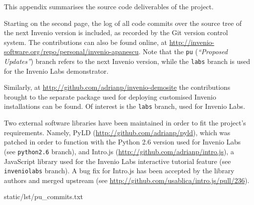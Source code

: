 
This appendix summarises the source code deliverables of the project.

Starting on the second page, the log of all code commits over the source tree
of the next Invenio version is included, as recorded by the Git version control
system. The contributions can also be found online, at
\url{http://invenio-software.org/repo/personal/invenio-apanescu}. Note that the
\texttt{pu} (\textit{``Proposed Updates''}) branch refers to the next Invenio
version, while the \texttt{labs} branch is used for the Invenio Labs
demonstrator.

Similarly, at \url{http://github.com/adrianp/invenio-demosite} the contributions
brought to the separate package used for deploying customised Invenio
installations can be found. Of interest is the \texttt{labs} branch, used for
Invenio Labs.

Two external software libraries have been maintained in order to fit the
project's requirements. Namely, PyLD (\url{http://github.com/adrianp/pyld}),
which was patched in order to function with the Python 2.6 version used for
Invenio Labs (see \texttt{python2.6} branch), and Intro.js
(\url{http://github.com/adrianp/intro.js}), a JavaScript library used for the
Invenio Labs interactive tutorial feature (see \texttt{inveniolabs} branch).
A bug fix for Intro.js has been accepted by the library authors and merged
upstream (see \url{http://github.com/usablica/intro.js/pull/236}).

\clearpage


  {static/lst/pu_commits.txt}

\clearpage
